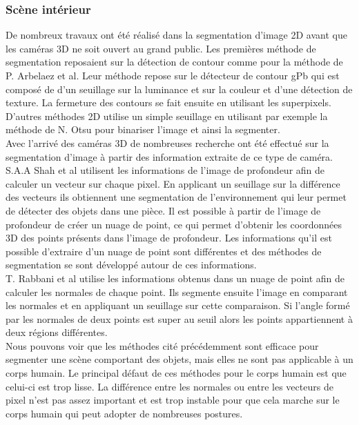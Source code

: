 \subsubsection{Scène intérieur}
De nombreux travaux ont été réalisé dans la segmentation d'image 2D avant que les caméras 3D ne soit
ouvert au grand public. Les premières méthode de segmentation reposaient sur la détection de contour
comme pour la méthode de P. Arbelaez et al\cite{2DSegmentation1}. Leur méthode repose sur le détecteur
de contour gPb qui est composé de d'un seuillage sur la luminance et sur la couleur et d'une détection
de texture. La fermeture des contours se fait ensuite en utilisant les superpixels. D'autres méthodes
2D utilise un simple seuillage en utilisant par exemple la méthode de N. Otsu\cite{Otsu} pour binariser
l'image et ainsi la segmenter.\\

Avec l'arrivé des caméras 3D de nombreuses recherche ont été effectué sur la segmentation d'image à partir
des information extraite de ce type de caméra. S.A.A Shah et al\cite{3DSegmentation1} utilisent les informations
de l'image de profondeur afin de calculer un vecteur sur chaque pixel. En applicant un seuillage sur la différence
des vecteurs ils obtiennent une segmentation de l'environnement qui leur permet de détecter des objets dans une pièce.
Il est possible à partir de l'image de profondeur de créer un nuage de point, ce qui permet d'obtenir les 
coordonnées 3D des points présents dans l'image de profondeur. Les informations qu'il est possible d'extraire
d'un nuage de point sont différentes et des méthodes de segmentation se sont développé autour de ces informations.\\

T. Rabbani et al\cite{pointCloudSegmentation} utilise les informations obtenus dans un nuage de point afin 
de calculer les normales de chaque point. Ils segmente ensuite l'image en comparant les normales et en appliquant
un seuillage sur cette comparaison. Si l'angle formé par les normales de deux points est super au seuil alors
les points appartiennent à deux régions différentes.\\

Nous pouvons voir que les méthodes cité précédemment sont efficace pour segmenter une scène comportant des objets,
mais elles ne sont pas applicable à un corps humain. Le principal défaut de ces méthodes pour le corps humain est 
que celui-ci est trop lisse. La différence entre les normales ou entre les vecteurs de pixel n'est pas assez important
et est trop instable pour que cela marche sur le corps humain qui peut adopter de nombreuses postures.

